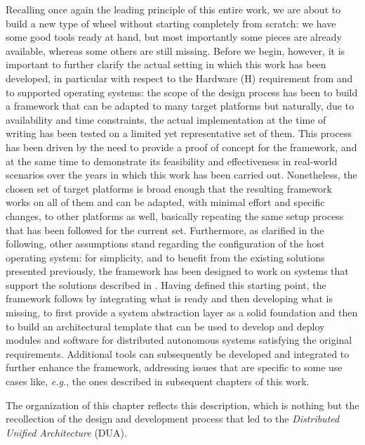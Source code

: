 Recalling once again the leading principle of this entire work, we are about to build a new type of wheel without starting completely from scratch: we have some good tools ready at hand, but most importantly some pieces are already available, whereas some others are still missing. Before we begin, however, it is important to further clarify the actual setting in which this work has been developed, in particular with respect to the Hardware (H) requirement from  and to supported operating systems: the scope of the design process has been to build a framework that can be adapted to many target platforms but naturally, due to availability and time constraints, the actual implementation at the time of writing has been tested on a limited yet representative set of them. This process has been driven by the need to provide a proof of concept for the framework, and at the same time to demonstrate its feasibility and effectiveness in real-world scenarios over the years in which this work has been carried out. Nonetheless, the chosen set of target platforms is broad enough that the resulting framework works on all of them and can be adapted, with minimal effort and specific changes, to other platforms as well, basically repeating the same setup process that has been followed for the current set. Furthermore, as clarified in the following, other assumptions stand regarding the configuration of the host operating system: for simplicity, and to benefit from the existing solutions presented previously, the framework has been designed to work on systems that support the solutions described in . Having defined this starting point, the framework follows by integrating what is ready and then developing what is missing, to first provide a system abstraction layer as a solid foundation and then to build an architectural template that can be used to develop and deploy modules and software for distributed autonomous systems satisfying the original requirements. Additional tools can subsequently be developed and integrated to further enhance the framework, addressing issues that are specific to some use cases like, \emph{e.g.}, the ones described in subsequent chapters of this work.

The organization of this chapter reflects this description, which is nothing but the recollection of the design and development process that led to the \emph{Distributed Unified Architecture} (DUA).

